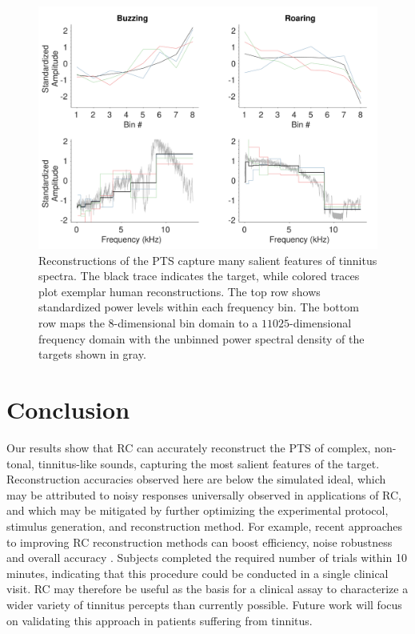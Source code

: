 \documentclass[journal]{IEEEtran}
\begin{document}
\begin{figure}[ht]
    \centering
    \includegraphics[width=\linewidth]{gfx/reconstruction_spectra_cropped.pdf}
    \caption{Reconstructions of the PTS capture many salient features of tinnitus spectra.
    The black trace indicates the target,
    while colored traces plot exemplar human reconstructions.
    The top row shows standardized power levels within each frequency bin.
    The bottom row maps the $8$-dimensional bin domain
    to a $11025$-dimensional frequency domain with the unbinned power spectral density of the targets shown in gray.}
    \label{fig:spectra}
\end{figure}

\section{Conclusion}

Our results show that RC can accurately reconstruct the PTS of complex, non-tonal, tinnitus-like sounds, capturing the most salient features of the target.
Reconstruction accuracies observed here are below the simulated ideal, which may be attributed to noisy responses universally observed in applications of RC, and which may be mitigated by further optimizing the experimental protocol, stimulus generation, and reconstruction method.
For example, recent approaches to improving RC reconstruction methods can boost efficiency, noise robustness and overall accuracy \cite{comptonStimulusWhiteningImproves2022a}.
Subjects completed the required number of trials within 10 minutes,
indicating that this procedure could be conducted in a single clinical visit.
RC may therefore be useful as the basis for a clinical assay to characterize a wider variety of tinnitus percepts than currently possible.
Future work will focus on validating this approach in patients suffering from tinnitus.
\end{document}
